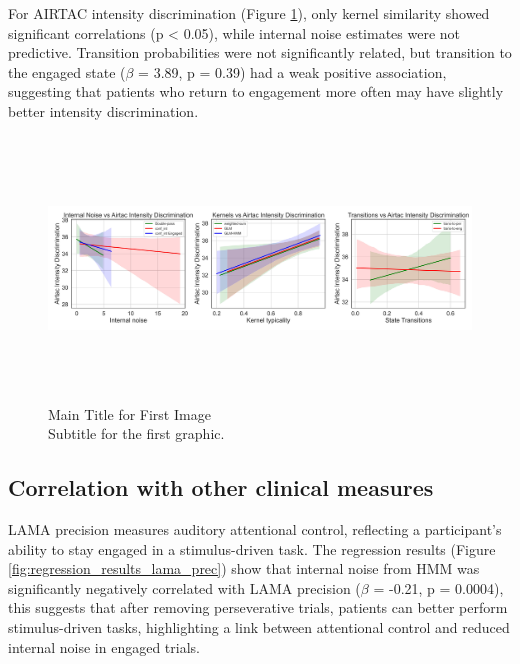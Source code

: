 For AIRTAC intensity discrimination (Figure \ref{fig:regression_results_airtac_int_discr}), only kernel similarity showed significant correlations (p < 0.05), while internal noise estimates were not predictive. Transition probabilities were not significantly related, but transition to the engaged state ($\beta$ = 3.89, p = 0.39) had a weak positive association, suggesting that patients who return to engagement more often may have slightly better intensity discrimination.
\begin{figure}[H]
    \centering
    \includegraphics[width=17cm,height=7cm]{MainLayout/Images/chapter8/regression_results_airtac_int_discr.jpg}
    \caption{Main Title for First Image \\ \small Subtitle for the first graphic.}
    \label{fig:regression_results_airtac_int_discr}
\end{figure}
\subsection {Correlation with other clinical measures} 
LAMA precision measures auditory attentional control, reflecting a participant’s ability to stay engaged in a stimulus-driven task. The regression results (Figure \ref{fig:regression_results_lama_prec}) show that internal noise from HMM was significantly negatively correlated with LAMA precision ($\beta$ = -0.21, p = 0.0004), this suggests that after removing perseverative trials, patients can better perform stimulus-driven tasks, highlighting a link between attentional control and reduced internal noise in engaged trials.


